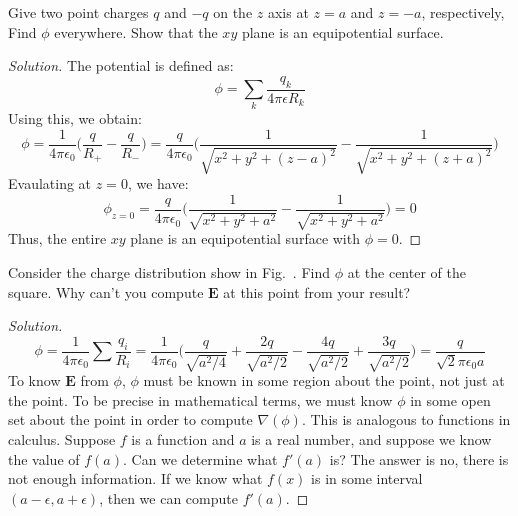 \documentclass[crop=false,class=article,oneside]{standalone}
\begin{document}
    \begin{problem}[Wangsness 5-3]
        \label{problem:EMAG_Wangsness_5_3}
        Give two point charges $q$ and $-q$ on the
        $z$ axis at $z=a$ and $z=-a$, respectively,
        Find $\phi$ everywhere. Show that the
        $xy$ plane is an equipotential surface.
    \end{problem}
    \begin{proof}[Solution]
        The potential is defined as:
        \begin{equation*}
            \phi=\sum_{k}\frac{q_{k}}{4\pi\epsilon{R_{k}}}
        \end{equation*}
        Using this, we obtain:
        \begin{equation*}
            \phi
            =\frac{1}{4\pi\epsilon_0}\bigg(
                \frac{q}{R_{+}}-\frac{q}{R_{-}}
            \bigg)
            =\frac{q}{4\pi\epsilon_0}
            \bigg(
                \frac{1}{\sqrt{x^2+y^2+(z-a)^2}}
                -\frac{1}{\sqrt{x^2+y^2+(z+a)^2}}
            \bigg)
        \end{equation*}
        Evaulating at $z=0$, we have:
        \begin{equation*}
            \phi_{z=0}
            =\frac{q}{4\pi\epsilon_0}\bigg(
                \frac{1}{\sqrt{x^2+y^2+a^2}}
                -\frac{1}{\sqrt{x^2+y^2+a^2}}
            \bigg)
            =0
        \end{equation*}
        Thus, the entire $xy$ plane is an
        equipotential surface with $\phi=0$.
    \end{proof}
    \begin{problem}[Wangsness 5-4]
        \label{problem:EMAG_Wangsness_5_4}
        Consider the charge distribution show in
        Fig.~.
        Find $\phi$ at the center of the square.
        Why can't you compute $\mathbf{E}$ at this
        point from your result?
    \end{problem}
    \begin{proof}[Solution]
    \begin{equation*}
        \phi=\frac{1}{4\pi\epsilon_{0}}
        \sum\frac{q_{i}}{R_{i}}
        =\frac{1}{4\pi \epsilon_0}\bigg(
            \frac{q}{\sqrt{a^2/4}}
            +\frac{2q}{\sqrt{a^2/2}}
            -\frac{4q}{\sqrt{a^2/2}}
            +\frac{3q}{\sqrt{a^2/2}}
        \bigg)
        =\frac{q}{\sqrt{2}\pi\epsilon_{0}a}    
    \end{equation*}
    To know $\mathbf{E}$ from $\phi$,
    $\phi$ must be known in some region about the point,
    not just at the point. To be precise in mathematical terms,
    we must know $\phi$ in some open set about the point in
    order to compute $\nabla(\phi)$. This is analogous to
    functions in calculus. Suppose $f$ is a function and
    $a$ is a real number, and suppose we know the value
    of $f(a)$. Can we determine what $f'(a)$ is?
    The answer is no, there is not enough information.
    If we know what $f(x)$ is in some interval $(a-\epsilon,a+\epsilon)$, then we can compute $f'(a)$.
    \end{proof}
\end{document}
